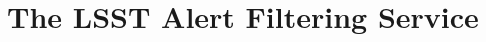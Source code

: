 \documentclass[DM,authoryear,toc]{lsstdoc}
\begin{document}



\section{The LSST Alert Filtering Service} \label{sec:LAFS}
\end{document}
